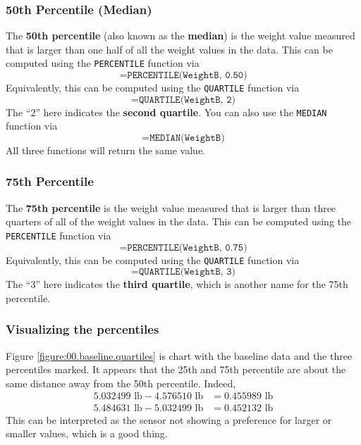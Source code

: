 \subsubsection{50th Percentile (Median)}
The \textbf{50th percentile} (also known as the \textbf{median}) is the weight value measured that is larger than one half of all the weight values in the data. This can be computed using the \texttt{PERCENTILE} function via
\begin{equation}
    \texttt{=PERCENTILE(WeightB, 0.50)}
\end{equation}
Equivalently, this can be computed using the \texttt{QUARTILE} function via
\begin{equation}
    \texttt{=QUARTILE(WeightB, 2)}
\end{equation}
The ``2'' here indicates the \textbf{second quartile}. You can also use the \texttt{MEDIAN} function via
\begin{equation}
    \texttt{=MEDIAN(WeightB)}
\end{equation}
All three functions will return the same value.
\subsubsection{75th Percentile}
The \textbf{75th percentile} is the weight value measured that is larger than three quarters of all of the weight values in the data. This can be computed using the \texttt{PERCENTILE} function via
\begin{equation}
    \texttt{=PERCENTILE(WeightB, 0.75)}
\end{equation}
Equivalently, this can be computed using the \texttt{QUARTILE} function via
\begin{equation}
    \texttt{=QUARTILE(WeightB, 3)}
\end{equation}
The ``3'' here indicates the \textbf{third quartile}, which is another name for the 75th percentile.
\subsubsection{Visualizing the percentiles}
Figure \ref{figure:00.baseline.quartiles} is chart with the baseline data and the three percentiles marked. It appears that the 25th and 75th percentile are about the same distance away from the 50th percentile. Indeed,
\begin{align}
    5.032499\text{ lb} - 4.576510\text{ lb} &= 0.455989 \text{ lb} \\
    5.484631\text{ lb} - 5.032499\text{ lb} &= 0.452132 \text{ lb}
\end{align}
This can be interpreted as the sensor not showing a preference for larger or smaller values, which is a good thing.


